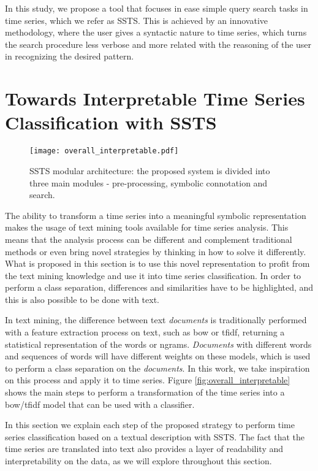 In this study, we propose a tool that focuses in ease simple query search tasks in time series, which we refer as \gls{SSTS}. This is achieved by an innovative methodology, where the user gives a syntactic nature to time series, which turns the search procedure less verbose and more related with the reasoning of the user in recognizing the desired pattern.







\section{Towards Interpretable Time Series Classification with SSTS}

\begin{figure}
\centering
\texttt{[image: overall\_interpretable.pdf]}
\label{fig:ssts_intro}
\caption{SSTS modular architecture: the proposed system is divided into three main modules - pre-processing, symbolic connotation and search.}
\end{figure}


The ability to transform a time series into a meaningful symbolic representation makes the usage of text mining tools available for time series analysis. This means that the analysis process can be different and complement traditional methods or even bring novel strategies by thinking in how to solve it differently. What is proposed in this section is to use this novel representation to profit from the text mining knowledge and use it into time series classification. In order to perform a class separation, differences and similarities have to be highlighted, and this is also possible to be done with text.
\par
In text mining, the difference between text \textit{documents} is traditionally performed with a feature extraction process on text, such as \gls{bow} or \gls{tfidf}, returning a statistical representation of the words or \gls{ngrams}. \textit{Documents} with different words and sequences of words will have different weights on these models, which is used to perform a class separation on the \textit{documents}. In this work, we take inspiration on this process and apply it to time series. Figure \ref{fig:overall_interpretable} shows the main steps to perform a transformation of the time series into a \gls{bow}/\gls{tfidf} model that can be used with a classifier. 
\par
In this section we explain each step of the proposed strategy to perform time series classification based on a textual description with \gls{SSTS}. The fact that the time series are translated into text also provides a layer of readability and interpretability on the data, as we will explore throughout this section.

